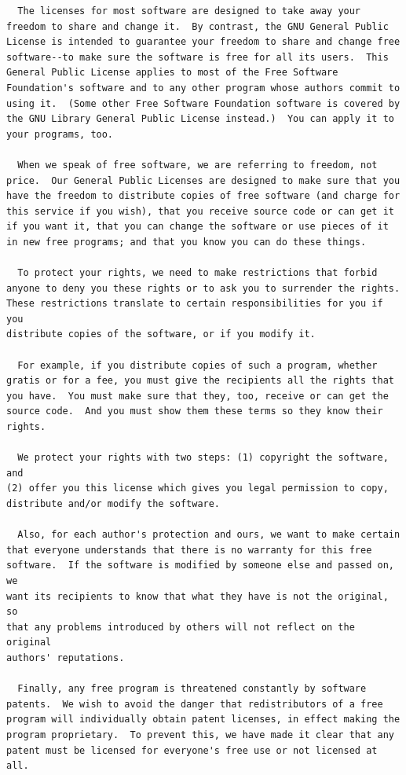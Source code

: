 \documentclass[mingoth,a4paper]{jsarticle}
\begin{document}
{{{{{{{{{{{{{{{{{{\begin{multicols}{2}
\begin{fontsize}{6}{6}
\begin{verbatim}
  The licenses for most software are designed to take away your
freedom to share and change it.  By contrast, the GNU General Public
License is intended to guarantee your freedom to share and change free
software--to make sure the software is free for all its users.  This
General Public License applies to most of the Free Software
Foundation's software and to any other program whose authors commit to
using it.  (Some other Free Software Foundation software is covered by
the GNU Library General Public License instead.)  You can apply it to
your programs, too.

  When we speak of free software, we are referring to freedom, not
price.  Our General Public Licenses are designed to make sure that you
have the freedom to distribute copies of free software (and charge for
this service if you wish), that you receive source code or can get it
if you want it, that you can change the software or use pieces of it
in new free programs; and that you know you can do these things.

  To protect your rights, we need to make restrictions that forbid
anyone to deny you these rights or to ask you to surrender the rights.
These restrictions translate to certain responsibilities for you if you
distribute copies of the software, or if you modify it.

  For example, if you distribute copies of such a program, whether
gratis or for a fee, you must give the recipients all the rights that
you have.  You must make sure that they, too, receive or can get the
source code.  And you must show them these terms so they know their
rights.

  We protect your rights with two steps: (1) copyright the software, and
(2) offer you this license which gives you legal permission to copy,
distribute and/or modify the software.

  Also, for each author's protection and ours, we want to make certain
that everyone understands that there is no warranty for this free
software.  If the software is modified by someone else and passed on, we
want its recipients to know that what they have is not the original, so
that any problems introduced by others will not reflect on the original
authors' reputations.

  Finally, any free program is threatened constantly by software
patents.  We wish to avoid the danger that redistributors of a free
program will individually obtain patent licenses, in effect making the
program proprietary.  To prevent this, we have made it clear that any
patent must be licensed for everyone's free use or not licensed at all.


\end{verbatim}
\end{fontsize}
\end{multicols}}}}}}}}}}}}}}}}}}}
\end{document}
